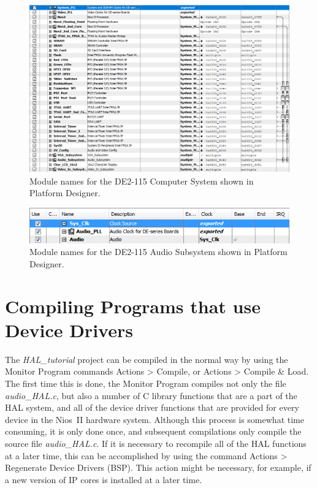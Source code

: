 \documentclass[11pt, twoside, pdftex]{article}
\begin{document}
\begin{figure}[h!]
   \begin{center}
      \includegraphics[scale=0.6]{figures/Qsys_DE2_Media.png}
   \end{center}
   \caption{Module names for the DE2-115 Computer System shown in Platform Designer.} 
	\label{fig:Qsys_DE2_Media}
\end{figure}

\begin{figure}[h!]
   \begin{center}
      \includegraphics[scale=0.6]{figures/Qsys_Audio_Subsystem.png}
   \end{center}
   \caption{Module names for the DE2-115 Audio Subsystem shown in Platform Designer.} 
	\label{fig:Qsys_Audio_Subsystem}
\end{figure}

\section{Compiling Programs that use Device Drivers}
The {\it HAL\_tutorial} project can be compiled in the normal way by using the Monitor Program commands {\sf Actions >
Compile}, or {\sf Actions > Compile \& Load}. The first time this is done, the Monitor Program compiles not only the file 
{\it audio\_HAL.c}, but also a number of C library
functions that are a part of the HAL system, and all of the device driver functions that are provided 
for every device in the Nios~II hardware system. Although this process is somewhat time consuming, it is only done once, and 
subsequent compilations only compile the source file {\it audio\_HAL.c}. If it is necessary to recompile all of
the HAL functions at a later time, this can be accomplished by using the command {\sf Actions > Regenerate Device
Drivers (BSP)}. This action might be necessary, for example, if a new version of IP cores is installed at a later
time.
\end{document}
